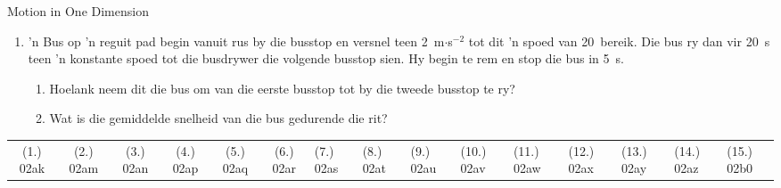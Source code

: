 \begin{eocexercises}{Motion in One Dimension}
\begin{enumerate}[noitemsep, label=\textbf{\arabic*}. ]
    \item 'n Bus op 'n reguit pad begin vanuit rus by die busstop en versnel teen 2~m$\cdot$s$^{-2}$ tot dit 'n spoed van 20~\ms  bereik. Die bus ry dan vir 20~s teen 'n konstante spoed tot die busdrywer die volgende busstop sien. Hy begin te rem en stop die bus in 5~s.
    \begin{enumerate}
    \item Hoelank neem dit die bus om van die eerste busstop tot by die tweede busstop te ry?
    \item Wat is die gemiddelde snelheid van die bus gedurende die rit?
    \end{enumerate}
    \end{enumerate}
\practiceinfo
     \par \begin{tabular}[h]{cccccc}
     (1.) 02ak  &  (2.) 02am  &  (3.) 02an  &  (4.) 02ap  &  (5.) 02aq  &  (6.) 02ar  & (7.) 02as & (8.) 02at & (9.) 02au & (10.) 02av &
    (11.) 02aw & (12.) 02ax & (13.) 02ay & (14.) 02az & (15.) 02b0
     \end{tabular}
\end{eocexercises}

